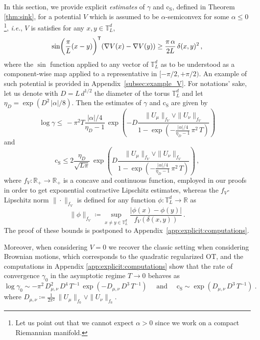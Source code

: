 \documentclass[final,12pt]{colt2023} %
\def\rset{\mathbb{R}}
\def\ie{\textit{i.e.}}
\newcommand{\bes}{\begin{equation}}
\newcommand{\ees}{\end{equation}}
\def\torus{\tset}
\def\torusL{\torus_L}
\def\rset{\mathbb{R}}
\def\tset{\mathbb{T}}
\def\ie{\textit{i.e.}}
\def\eqsp{\;}
\def\cconst{\mathrm{c}_{\mathrm{S}}}
\begin{document}
In this section, we provide explicit \textit{estimates} of $\gamma$ and $\cconst$, defined in Theorem \ref{thm:sink}, for a potential $V$ which is assumed to be $\alpha$-semiconvex for some $\alpha\leq 0$\footnote{Let us point out that we cannot expect $\alpha >0$ since we work on a compact Riemannian manifold.}, \ie, $V$ is satisfies for any $x,y \in \torusL^d$,
\begin{equation}\label{def:sin:a:conv}
\sin\biggl(\frac{\pi}{L}(x-y)\biggr)^{{\sf  T}}(\nabla V(x)-\nabla V(y))\geq\frac{\pi\,\alpha}{2L}\,\delta(x,y)^2  \, ,
\end{equation}
where the $\sin$ function applied to any vector of $\torusL^d$ as to be understood as a component-wise map applied to a representative in $[-\pi/2,+\pi/2)$.
An example of such potential is provided in Appendix~\ref{subsec:example_V}. 
For notations' sake, let us denote with $D=L\,d^{1/2}$ the diameter of the torus $\mathbb{T}_L^d$ and let $\eta_D=\exp(D^2\, |\alpha|/8)$.
Then the estimates of $\gamma$ and $\cconst$ are given by 
\bes
\label{eq:estimate_gamma}
\log\gamma\leq\, -\pi^2 T\frac{|\alpha|/4}{\eta_D-1}\,\exp\left(- D\frac{ \|U_{\mu}\|_{f_V}\vee\|U_{\nu}\|_{f_V}}{1-\exp\left(-\frac{ |\alpha|/4 }{\eta_D-1}\,\pi^2\,T\right)}\right)
\ees
and
\bes
\label{eq:estimate_c}
     \cconst\leq 2\frac{\eta_D}{\sqrt{L \pi}}\,\exp\left(D\frac{ \|U_{\mu}\|_{f_V}\vee\|U_{\nu}\|_{f_V}}{1-\exp\left(-\frac{|\alpha|/4  }{\eta_D-1}\, \pi^2\,T\right)}\right)\,,
\ees
where $f_V:  \rset_+ \to \rset_+$ is a concave and continuous function, employed in our proofs in order to get exponential contractive Lipschitz estimates, whereas 
the $f_V$-Lipschitz norm $\|\cdot\|_{f_V}$ is defined for any function $\phi : \torusL^d \to \rset$ as 
\bes 
\| \phi\|_{f_V} \coloneqq \sup_{x\neq y\in\mathbb{T}_L^d} \frac{|\phi(x)-\phi(y)|}{f_V(\delta(x,y))}\,.
\ees
The proof of these bounds is postponed to Appendix~\ref{app:explicit:computations}. 

Moreover, when considering $V=0$ we recover the classic setting when considering Brownian motions, which corresponds to the quadratic regularized OT, and the computations in Appendix \ref{app:explicit:computations} show that the rate of convergence $\gamma_0$ in the asymptotic regime $T\to 0$ behaves as
\begin{equation}\label{eq:asympt:gamma0}
\log\gamma_0\sim -\pi^2\,D_{\mu,\nu}^2\,{D^4}\,T^{-1}\,\exp(- D_{\mu,\nu}\,D^3\,T^{-1})\quad\text{ and }\quad
\cconst\sim\exp(D_{\mu,\nu}\,D^3\,T^{-1}) \eqsp.
\end{equation}
where $D_{\mu,\nu}\coloneqq \frac{1}{2\pi^2}\,\|U_{\mu}\|_{f_0}\vee\|U_{\nu}\|_{f_0}$.
\end{document}
